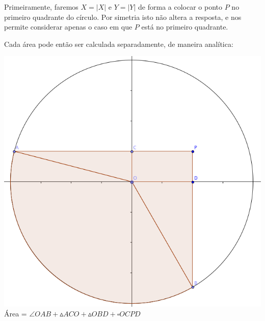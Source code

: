 Primeiramente, faremos $X=|X|$ e $Y=|Y|$ de forma a colocar o ponto $P$ no
primeiro quadrante do círculo. Por simetria isto não altera a resposta, e nos
permite considerar apenas o caso em que $P$ está no primeiro quadrante.

Cada área pode então ser calculada separadamente, de maneira analítica:

\begin{center}
\begin{multicols}{2}
\includegraphics[scale=1.2]{A1.png}\\
Área = $\angle OAB + \vartriangle ACO + \vartriangle OBD + \square OCPD$\\


\end{multicols}
\end{center}
